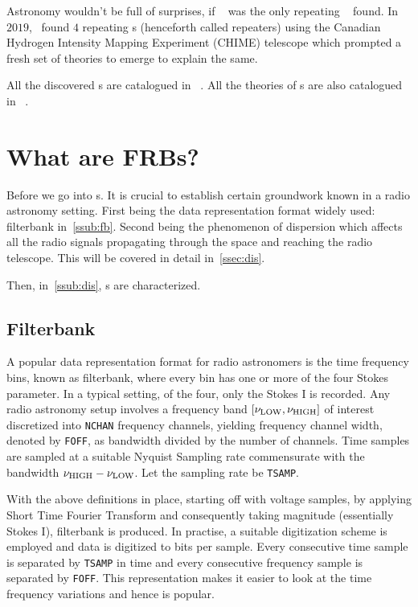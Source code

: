 \par Astronomy wouldn't be full of surprises, if ~ was the only repeating \frb{}~ found. In $2019$,~\cite{chime_repeaters} found $4$ repeating \frb{}s (henceforth called repeaters) using the Canadian Hydrogen Intensity Mapping Experiment (CHIME) telescope which prompted a fresh set of theories to emerge to explain the same.

\par All the discovered \frb{}s are catalogued in ~\cite{frbcat}. All the theories of \frb{}s are also catalogued in ~\cite{frbtheorycat}.


\section{What are FRBs?}

\par Before we go into \frb{}s. It is crucial to establish certain groundwork known in a radio astronomy setting. 
First being the data representation format widely used: filterbank in~\autoref{ssub:fb}. 
Second being the phenomenon of dispersion which affects all the radio signals propagating through the space and reaching the radio telescope. 
This will be covered in detail in~\autoref{ssec:dis}.

\par Then, in~\autoref{ssub:dis}, \frb{}s are characterized.

\subsection{Filterbank}
\label{ssub:fb}

\par A popular data representation format for radio astronomers is the time frequency bins, known as filterbank, where every bin has one or more of the four Stokes parameter. In a typical setting, of the four, only the Stokes I is recorded.
Any radio astronomy setup involves a frequency band $[\nu_{\rm LOW}, \nu_{\rm HIGH}]$ of interest discretized into \texttt{NCHAN} frequency channels, yielding frequency channel width, denoted by \texttt{FOFF}, as bandwidth divided by the number of channels.
Time samples are sampled at a suitable Nyquist Sampling rate commensurate with the bandwidth $\nu_{\rm HIGH} - \nu_{\rm LOW}$. Let the sampling rate be \texttt{TSAMP}.

\par With the above definitions in place, starting off with voltage samples, by applying Short Time Fourier Transform and consequently taking magnitude (essentially Stokes I), filterbank is produced. In practise, a suitable digitization scheme is employed and data is digitized to  bits per sample.
Every consecutive time sample is separated by \texttt{TSAMP} in time and every consecutive frequency sample is separated by \texttt{FOFF}.
This representation makes it easier to look at the time frequency variations and hence is popular.

